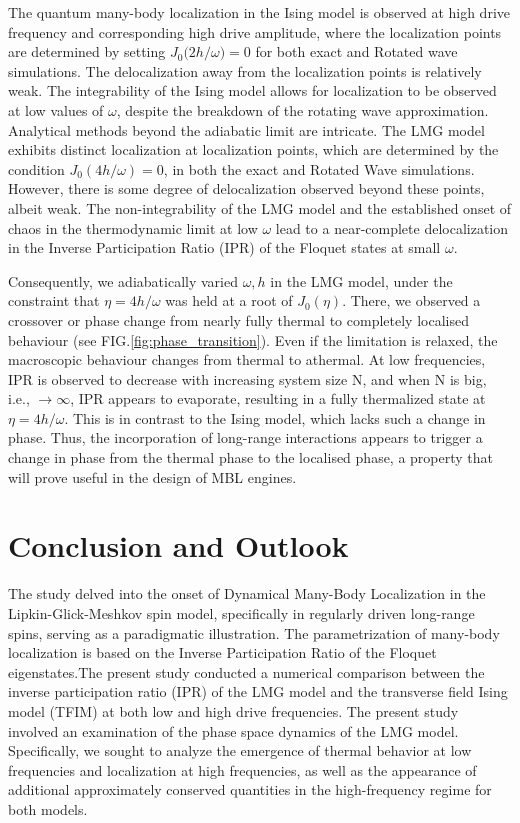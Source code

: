 \documentclass[%
reprint,
superscriptaddress,
amsmath,amssymb,
aps,
prb,
showkeys,
]{revtex4-2}
\begin{document}
	The quantum many-body localization in the Ising model is observed at high drive frequency and corresponding high drive amplitude, where the localization points are determined by setting $J_0(2h/{\omega}\big)=0$ for both exact and Rotated wave simulations. The delocalization away from the localization points is relatively weak. The integrability of the Ising model allows for localization to be observed at low values of $\omega$, despite the breakdown of the rotating wave approximation. Analytical methods beyond the adiabatic limit are intricate. The LMG model exhibits distinct localization at localization points, which are determined by the condition $J_0(4h/\omega)=0$, in both the exact and Rotated Wave simulations. However, there is some degree of delocalization observed beyond these points, albeit weak. The non-integrability of the LMG model and the established onset of chaos in the thermodynamic limit at low $\omega$ lead to a near-complete delocalization in the Inverse Participation Ratio (IPR) of the Floquet states at small $\omega$. 
	
	Consequently, we adiabatically varied $\omega, h$ in the LMG model, under the constraint that $\eta=4h/\omega$ was held at a root of $J_0(\eta)$. There, we observed a crossover or phase change from nearly fully thermal to completely localised behaviour (see FIG.\ref{fig:phase_transition}).
	Even if the limitation is relaxed, the macroscopic behaviour changes from thermal to athermal.
	At low frequencies, IPR is observed to decrease with increasing system size N, and when N is big, i.e., $\rightarrow{} \infty$, IPR appears to evaporate, resulting in a fully thermalized state at $\eta=4h/\omega$.
	This is in contrast to the Ising model, which lacks such a change in phase. Thus, the incorporation of long-range interactions appears to trigger a change in phase from the thermal phase to the localised phase, a property that will prove useful in the design of MBL engines. 
	
	\section{\label{sec:level7}Conclusion and Outlook}
	
	The study delved into the onset of Dynamical Many-Body Localization in the Lipkin-Glick-Meshkov spin model, specifically in regularly driven long-range spins, serving as a paradigmatic illustration. The parametrization of many-body localization is based on the Inverse Participation Ratio of the Floquet eigenstates.The present study conducted a numerical comparison between the inverse participation ratio (IPR) of the LMG model and the transverse field Ising model (TFIM) at both low and high drive frequencies. The present study involved an examination of the phase space dynamics of the LMG model. Specifically, we sought to analyze the emergence of thermal behavior at low frequencies and localization at high frequencies, as well as the appearance of additional approximately conserved quantities in the high-frequency regime for both models.
	
\end{document}
